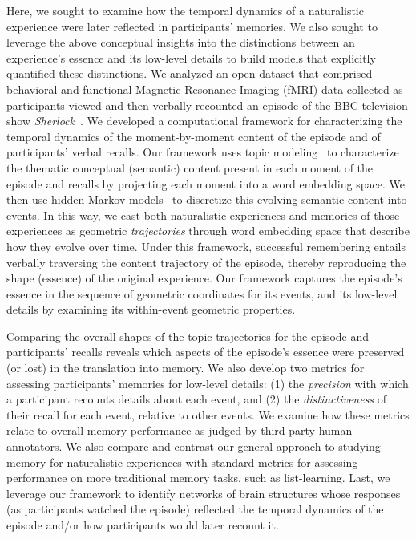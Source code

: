 \documentclass[10pt]{article}
\begin{document}
Here, we sought to examine how the temporal dynamics of a naturalistic experience were later reflected in participants' memories.  We also sought to leverage the above conceptual insights into the distinctions between an experience's essence and its low-level details to build models that explicitly quantified these distinctions.  We analyzed an open dataset that comprised behavioral and functional Magnetic Resonance Imaging (fMRI) data collected as participants viewed and then verbally recounted an episode of the BBC television show \textit{Sherlock}~\citep{ChenEtal17}.  We developed a computational framework for characterizing the temporal dynamics of the moment-by-moment content of the episode and of participants' verbal recalls.  Our framework uses topic modeling~\citep{BleiEtal03} to characterize the thematic conceptual (semantic) content present in each moment of the episode and recalls by projecting each moment into a word embedding space.  We then use hidden Markov models~\citep{Rabi89, BaldEtal17} to discretize this evolving semantic content into events.  In this way, we cast both naturalistic experiences and memories of those experiences as geometric \textit{trajectories} through word embedding space that describe how they evolve over time. Under this framework, successful remembering entails verbally traversing the content trajectory of the episode, thereby reproducing the shape (essence) of the original experience.  Our framework captures the episode's essence in the sequence of geometric coordinates for its events, and its low-level details by examining its within-event geometric properties.

Comparing the overall shapes of the topic trajectories for the episode and participants' recalls reveals which aspects of the episode's essence were preserved (or lost) in the translation into memory.  We also develop two metrics for assessing participants' memories for low-level details: (1) the \textit{precision} with which a participant recounts details about each event, and (2) the \textit{distinctiveness} of their recall for each event, relative to other events.  We examine how these metrics relate to overall memory performance as judged by third-party human annotators.  We also compare and contrast our general approach to studying memory for naturalistic experiences with standard metrics for assessing performance on more traditional memory tasks, such as list-learning.  Last, we leverage our framework to identify networks of brain structures whose responses (as participants watched the episode) reflected the temporal dynamics of the episode and/or how participants would later recount it.
\end{document}
